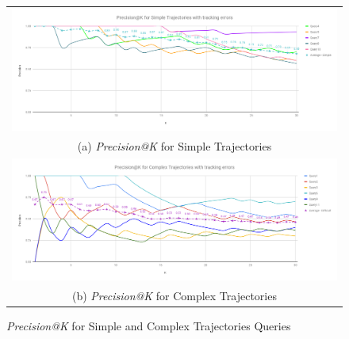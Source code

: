 \begin{figure}[htb!]
  \centering
\begin{tabular}{c}
 \includegraphics[width=0.9\linewidth]{image/retrievalTwo/p@k_simple.png}\\
 (a) \textit{Precision@K} for Simple Trajectories \\
 \includegraphics[width=0.9\linewidth]{image/retrievalTwo/p@k_complex.png} \\
 (b) \textit{Precision@K} for Complex Trajectories
\end{tabular}
\caption{\textit{Precision@K} for Simple and Complex Trajectories Queries}
\label{fig:versionTwoPatKAll}
\end{figure}


